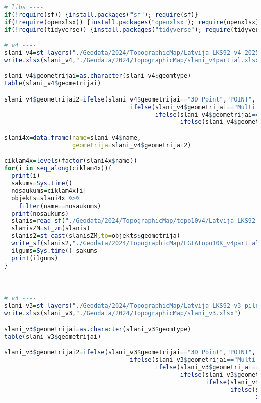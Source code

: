 \documentclass[
]{book}
\begin{document}
\begin{lstlisting}[language=R]
# libs ----
if(!require(sf)) {install.packages("sf"); require(sf)}
if(!require(openxlsx)) {install.packages("openxlsx"); require(openxlsx)}
if(!require(tidyverse)) {install.packages("tidyverse"); require(tidyverse)}

# v4 ----
slani_v4=st_layers("./Geodata/2024/TopographicMap/Latvija_LKS92_v4_20250703.gdb/")
write.xlsx(slani_v4,"./Geodata/2024/TopographicMap/slani_v4partial.xlsx")

slani_v4$geometrijai=as.character(slani_v4$geomtype)
table(slani_v4$geometrijai)

slani_v4$geometrijai2=ifelse(slani_v4$geometrijai=="3D Point","POINT",
                                   ifelse(slani_v4$geometrijai=="Multi Polygon","MULTIPOLYGON",
                                          ifelse(slani_v4$geometrijai=="3D Multi Line String","MULTILINESTRING",
                                                 ifelse(slani_v4$geometrijai=="3D Multi Polygon","MULTIPOLYGON",NA))))

slani4x=data.frame(name=slani_v4$name,
                   geometrija=slani_v4$geometrijai2)

ciklam4x=levels(factor(slani4x$name))
for(i in seq_along(ciklam4x)){
  print(i)
  sakums=Sys.time()
  nosaukums=ciklam4x[i]
  objekts=slani4x %>% 
    filter(name==nosaukums)
  print(nosaukums)
  slanis=read_sf("./Geodata/2024/TopographicMap/topo10v4/Latvija_LKS92_v4_20250703.gdb/",layer=nosaukums)
  slanisZM=st_zm(slanis)
  slanis2=st_cast(slanisZM,to=objekts$geometrija)
  write_sf(slanis2,"./Geodata/2024/TopographicMap/LGIAtopo10K_v4partial.gpkg",layer=nosaukums,append=FALSE)
  ilgums=Sys.time()-sakums
  print(ilgums)
}



# v3 ----
slani_v3=st_layers("./Geodata/2024/TopographicMap/Latvija_LKS92_v3_pilnais.gdb/")
write.xlsx(slani_v3,"./Geodata/2024/TopographicMap/slani_v3.xlsx")

slani_v3$geometrijai=as.character(slani_v3$geomtype)
table(slani_v3$geometrijai)

slani_v3$geometrijai2=ifelse(slani_v3$geometrijai=="3D Point","POINT",
                                   ifelse(slani_v3$geometrijai=="Multi Polygon","MULTIPOLYGON",
                                          ifelse(slani_v3$geometrijai=="3D Multi Line String","MULTILINESTRING",
                                                 ifelse(slani_v3$geometrijai=="3D Multi Polygon","MULTIPOLYGON",
                                                        ifelse(slani_v3$geometrijai=="Point","POINT",
                                                               ifelse(slani_v3$geometrijai=="Multi Line String","MULTILINESTRING",
                                                                      ifelse(slani_v3$geometrijai=="3D Measured Point","POINT",NA)))))))


\end{lstlisting}
\end{document}
